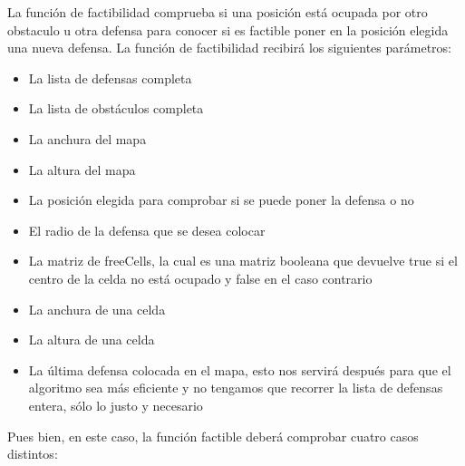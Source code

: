 La función de factibilidad comprueba si una posición está ocupada por otro obstaculo u otra defensa para conocer si es factible poner en la posición elegida una nueva defensa. 
La función de factibilidad recibirá los siguientes parámetros:
\begin{itemize}
    \item La lista de defensas completa
    \item La lista de obstáculos completa
    \item La anchura del mapa
    \item La altura del mapa
    \item La posición elegida para comprobar si se puede poner la defensa o no
    \item El radio de la defensa que se desea colocar
    \item La matriz de freeCells, la cual es una matriz booleana que devuelve true si el centro de la celda no está ocupado y false en el caso contrario
    \item La anchura de una celda
    \item La altura de una celda
    \item La última defensa colocada en el mapa, esto nos servirá después para que el algoritmo sea más eficiente y no tengamos que recorrer la lista de defensas entera, sólo lo justo y necesario
\end{itemize}
Pues bien, en este caso, la función factible deberá comprobar cuatro casos distintos:

